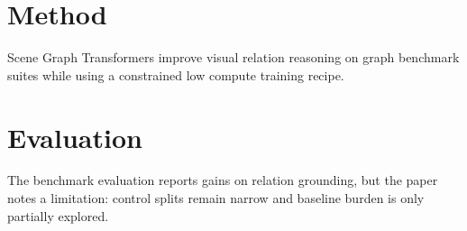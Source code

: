 \section{Method}
Scene Graph Transformers improve visual relation reasoning on graph benchmark suites while using a constrained low compute training recipe.

\section{Evaluation}
The benchmark evaluation reports gains on relation grounding, but the paper notes a limitation: control splits remain narrow and baseline burden is only partially explored.
